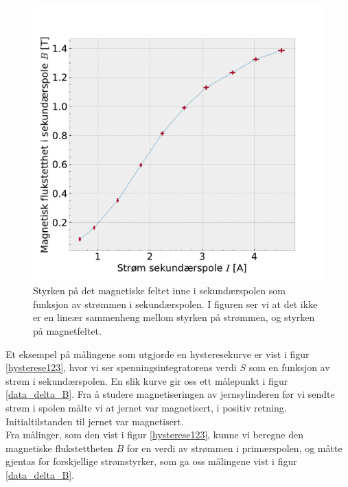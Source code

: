 \documentclass[%
 reprint,
nofootinbib,
aps,
]{revtex4-1}
\begin{document}
\begin{figure}[h!]
  \centering
  \includegraphics[scale=0.45]{magnetic_secondary_hysterese.pdf}
  \caption{Styrken på det magnetiske feltet inne i sekundærspolen som funksjon av strømmen i sekundærspolen. I figuren ser vi at det ikke er en lineær sammenheng mellom styrken på strømmen, og styrken på magnetfeltet.}
  \label{data_delta_B}
\end{figure}
Et eksempel på målingene som utgjorde en hysteresekurve er vist i figur \vref{hysterese123}, hvor vi ser spenningsintegratorens verdi $S$ som en funksjon av strøm i sekundærspolen. En slik kurve gir oss ett målepunkt i figur \vref{data_delta_B}. Fra å studere magnetiseringen av jernsylinderen før vi sendte strøm i spolen målte vi at jernet var magnetisert, i positiv retning. Initialtilstanden til jernet var magnetisert. \\ Fra målinger, som den vist i figur \vref{hysterese123}, kunne vi beregne den magnetiske flukstettheten $B$ for en verdi av strømmen i primærspolen, og måtte gjentas for forskjellige strømstyrker, som ga oss målingene vist i figur \vref{data_delta_B}.
\end{document}
